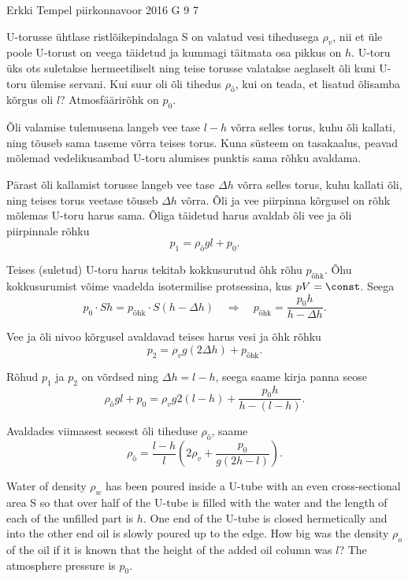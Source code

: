 {Erkki Tempel} %
{piirkonnavoor} %
{2016} %
{G 9} %
{7} %
{
\ifStatement
U-torusse ühtlase ristlõikepindalaga S on valatud vesi tihedusega $\rho_v$, nii et üle poole U-torust on veega täidetud ja kummagi täitmata osa pikkus on $h$. U-toru üks ots suletakse hermeetiliselt ning teise torusse valatakse aeglaselt õli kuni U-toru ülemise servani. Kui suur oli õli tihedus $\rho_{\text{õ}}$, kui on teada, et lisatud õlisamba kõrgus oli $l$? Atmosfäärirõhk on $p_0$.
\fi


\ifHint
Õli valamise tulemusena langeb vee tase $l - h$ võrra selles torus, kuhu õli kallati, ning tõuseb sama taseme võrra teises torus. Kuna süsteem on tasakaalus, peavad mõlemad vedelikusambad U-toru alumises punktis sama rõhku avaldama.
\fi


\ifSolution
Pärast õli kallamist torusse langeb vee tase $\Delta h$ võrra selles torus, kuhu kallati õli, ning teises torus veetase tõuseb $\Delta h$ võrra. Õli ja vee piirpinna kõrgusel on rõhk mõlemas U-toru harus sama. Õliga täidetud harus avaldab õli vee ja õli piirpinnale rõhku
\[ p_1 = \rho_{\text{õ}}gl + p_0.\]

Teises (suletud) U-toru harus tekitab kokkusurutud õhk rõhu $p_{\text{õhk}}$. Õhu kokkusurumist võime vaadelda isotermilise protsessina, kus $pV = \const$. Seega
\[ p_0\cdot Sh = p_{\text{õhk}}\cdot S(h-\Delta h) \quad\Rightarrow\quad p_{\text{õhk}} = \frac{p_0h}{h-\Delta h}.\]

Vee ja õli nivoo kõrgusel avaldavad teises harus vesi ja õhk rõhku
\[ p_2 = \rho_vg(2\Delta h) + p_{\text{õhk}}.\]

Rõhud $p_1$ ja $p_2$ on võrdsed ning $\Delta h = l - h$, seega saame kirja panna seose
\[ \rho_{\text{õ}}gl + p_0 = \rho_vg2(l-h) + \frac{p_0h}{h-(l-h)}.\]

Avaldades viimasest seosest õli tiheduse $\rho_{\text{õ}}$, saame
\[ \rho_{\text{õ}} = \frac{l-h}{l}\left(2\rho_v+\frac{p_0}{g(2h-l)}\right).\]
\fi


\ifEngStatement
Water of density $\rho_w$ has been poured inside a U-tube with an even cross-sectional area S so that over half of the U-tube is filled with the water and the length of each of the unfilled part is $h$. One end of the U-tube is closed hermetically and into the other end oil is slowly poured up to the edge. How big was the density $\rho_{o}$ of the oil if it is known that the height of the added oil column was $l$? The atmosphere pressure is $p_0$.
\fi


}
